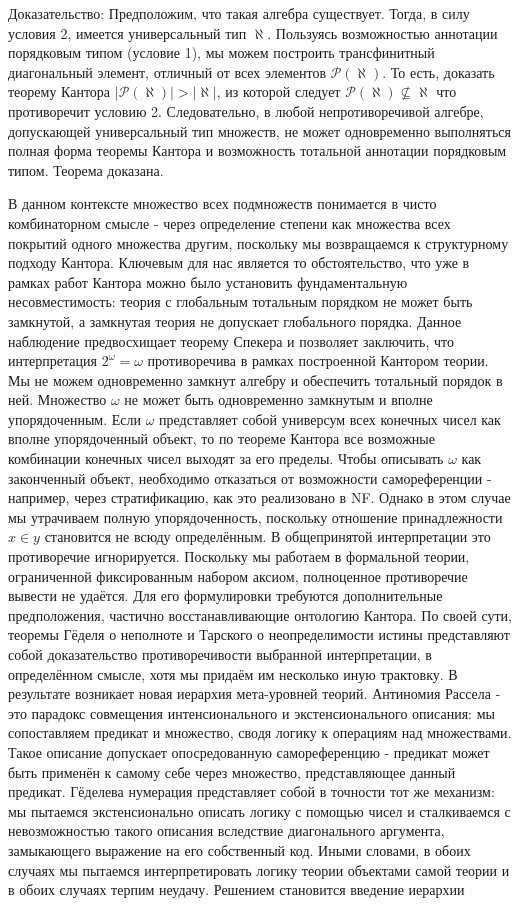 \documentclass[12pt]{article}
\begin{document}
Доказательство:
Предположим, что такая алгебра существует. Тогда, в силу условия 2, имеется универсальный тип $\aleph$. Пользуясь возможностью аннотации порядковым типом (условие 1), мы можем построить трансфинитный диагональный элемент, отличный от всех элементов $\mathcal{P}(\aleph)$. То есть, доказать теорему Кантора $|\mathcal{P}(\aleph)| > |\aleph|$, из которой следует $\mathcal{P}(\aleph) \not\subseteq \aleph$ что противоречит условию 2. Следовательно, в любой непротиворечивой алгебре, допускающей универсальный тип множеств, не может одновременно выполняться полная форма теоремы Кантора и возможность тотальной аннотации порядковым типом. Теорема доказана.

В данном контексте множество всех подмножеств понимается в чисто комбинаторном смысле - через определение степени как множества всех покрытий одного множества другим, поскольку мы возвращаемся к структурному подходу Кантора. Ключевым для нас является то обстоятельство, что уже в рамках работ Кантора можно было установить фундаментальную несовместимость: теория с глобальным тотальным порядком не может быть замкнутой, а замкнутая теория не допускает глобального порядка. Данное наблюдение предвосхищает теорему Спекера и позволяет заключить, что интерпретация $2^\omega = \omega$ противоречива в рамках построенной Кантором теории. Мы не можем одновременно замкнут алгебру и обеспечить тотальный порядок в ней. Множество $\omega$ не может быть одновременно замкнутым и вполне упорядоченным. Если $\omega$ представляет собой универсум всех конечных чисел как вполне упорядоченный объект, то по теореме Кантора все возможные комбинации конечных чисел выходят за его пределы. Чтобы описывать $\omega$ как законченный объект, необходимо отказаться от возможности самореференции - например, через стратификацию, как это реализовано в NF. Однако в этом случае мы утрачиваем полную упорядоченность, поскольку отношение принадлежности $x \in y$ становится не всюду определённым. В общепринятой интерпретации это противоречие игнорируется. Поскольку мы работаем в формальной теории, ограниченной фиксированным набором аксиом, полноценное противоречие вывести не удаётся. Для его формулировки требуются дополнительные предположения, частично восстанавливающие онтологию Кантора. По своей сути, теоремы Гёделя о неполноте и Тарского о неопределимости истины представляют собой доказательство противоречивости выбранной интерпретации, в определённом смысле, хотя мы придаём им несколько иную трактовку. В результате возникает новая иерархия мета-уровней теорий. Антиномия Рассела - это парадокс совмещения интенсионального и экстенсионального описания: мы сопоставляем предикат и множество, сводя логику к операциям над множествами. Такое описание допускает опосредованную самореференцию - предикат может быть применён к самому себе через множество, представляющее данный предикат. Гёделева нумерация представляет собой в точности тот же механизм: мы пытаемся экстенсионально описать логику с помощью чисел и сталкиваемся с невозможностью такого описания вследствие диагонального аргумента, замыкающего выражение на его собственный код. Иными словами, в обоих случаях мы пытаемся интерпретировать логику теории объектами самой теории и в обоих случаях терпим неудачу. Решением становится введение иерархии 
\end{document}
